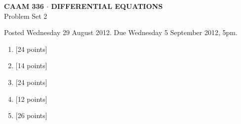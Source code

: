 \documentclass[10pt]{article}
\begin{document}
\begin{center}
\large \textsf{\textbf{CAAM 336 $\cdot$ DIFFERENTIAL EQUATIONS}\\[0.5em]
Problem Set 2 }
\end{center}

Posted Wednesday 29 August 2012. Due Wednesday 5 September 2012, 5pm.

\begin{enumerate}
\item {[24 points]}\\  

\vspace*{1em}
\item {[14 points]}\\  

\vspace*{1em}
\item {[24 points]}\\  

\vspace*{1em}
\item {[12 points]}\\  

\vspace*{2em}

\item {[26 points]}\\  

\end{enumerate}
\end{document}
